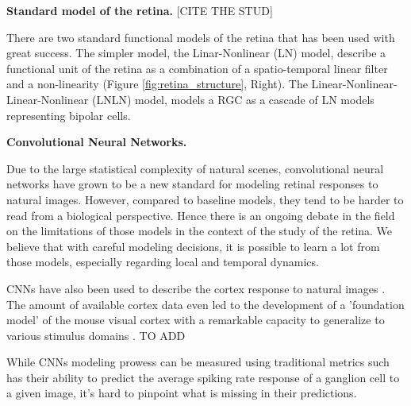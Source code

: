 \textbf{Standard model of the retina.}
[CITE THE STUD]

There are two standard functional models of the retina that has been used with
great success. The simpler model, the Linar-Nonlinear (LN) model, describe a
functional unit
of the retina as a combination of a spatio-temporal linear filter and a
non-linearity (Figure \ref{fig:retina_structure}, Right).
The Linear-Nonlinear-Linear-Nonlinear (LNLN) model, models a RGC as a cascade
of LN models representing bipolar cells.

\textbf{Convolutional Neural Networks.}

Due to the large statistical complexity of natural scenes, convolutional neural
networks have grown to be a new standard for modeling retinal responses to
natural images. However, compared to baseline models, they tend to be harder to
read from a biological perspective. Hence there is an ongoing debate in the
field on the limitations of those models in the context of the study of the
retina. We believe that with careful modeling decisions, it is possible to
learn a lot from those models, especially regarding local and temporal
dynamics.

CNNs have also been used to describe the cortex response to natural images
\citep{cadena_deep_2019}. The amount of available cortex data even led to the
development of a 'foundation model' of the mouse visual cortex with a
remarkable capacity to generalize to various stimulus domains \cite{wang}. TO
ADD

While CNNs modeling prowess can be measured using traditional metrics such has
their ability to predict the average spiking rate response of a ganglion cell
to a given image, it's hard to pinpoint what is missing in their predictions.